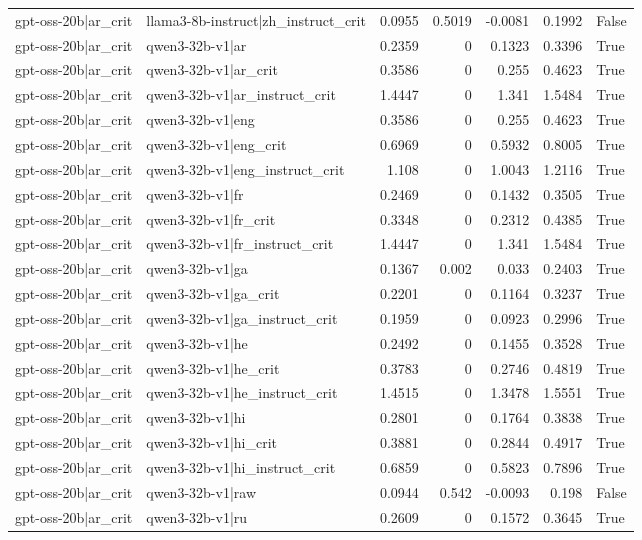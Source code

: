 \begin{table}
\begin{tabular}{l l r r r r l}
gpt-oss-20b|ar_crit & llama3-8b-instruct|zh_instruct_crit & 0.0955 & 0.5019 & -0.0081 & 0.1992 & False \\
gpt-oss-20b|ar_crit & qwen3-32b-v1|ar & 0.2359 & 0 & 0.1323 & 0.3396 & True \\
gpt-oss-20b|ar_crit & qwen3-32b-v1|ar_crit & 0.3586 & 0 & 0.255 & 0.4623 & True \\
gpt-oss-20b|ar_crit & qwen3-32b-v1|ar_instruct_crit & 1.4447 & 0 & 1.341 & 1.5484 & True \\
gpt-oss-20b|ar_crit & qwen3-32b-v1|eng & 0.3586 & 0 & 0.255 & 0.4623 & True \\
gpt-oss-20b|ar_crit & qwen3-32b-v1|eng_crit & 0.6969 & 0 & 0.5932 & 0.8005 & True \\
gpt-oss-20b|ar_crit & qwen3-32b-v1|eng_instruct_crit & 1.108 & 0 & 1.0043 & 1.2116 & True \\
gpt-oss-20b|ar_crit & qwen3-32b-v1|fr & 0.2469 & 0 & 0.1432 & 0.3505 & True \\
gpt-oss-20b|ar_crit & qwen3-32b-v1|fr_crit & 0.3348 & 0 & 0.2312 & 0.4385 & True \\
gpt-oss-20b|ar_crit & qwen3-32b-v1|fr_instruct_crit & 1.4447 & 0 & 1.341 & 1.5484 & True \\
gpt-oss-20b|ar_crit & qwen3-32b-v1|ga & 0.1367 & 0.002 & 0.033 & 0.2403 & True \\
gpt-oss-20b|ar_crit & qwen3-32b-v1|ga_crit & 0.2201 & 0 & 0.1164 & 0.3237 & True \\
gpt-oss-20b|ar_crit & qwen3-32b-v1|ga_instruct_crit & 0.1959 & 0 & 0.0923 & 0.2996 & True \\
gpt-oss-20b|ar_crit & qwen3-32b-v1|he & 0.2492 & 0 & 0.1455 & 0.3528 & True \\
gpt-oss-20b|ar_crit & qwen3-32b-v1|he_crit & 0.3783 & 0 & 0.2746 & 0.4819 & True \\
gpt-oss-20b|ar_crit & qwen3-32b-v1|he_instruct_crit & 1.4515 & 0 & 1.3478 & 1.5551 & True \\
gpt-oss-20b|ar_crit & qwen3-32b-v1|hi & 0.2801 & 0 & 0.1764 & 0.3838 & True \\
gpt-oss-20b|ar_crit & qwen3-32b-v1|hi_crit & 0.3881 & 0 & 0.2844 & 0.4917 & True \\
gpt-oss-20b|ar_crit & qwen3-32b-v1|hi_instruct_crit & 0.6859 & 0 & 0.5823 & 0.7896 & True \\
gpt-oss-20b|ar_crit & qwen3-32b-v1|raw & 0.0944 & 0.542 & -0.0093 & 0.198 & False \\
gpt-oss-20b|ar_crit & qwen3-32b-v1|ru & 0.2609 & 0 & 0.1572 & 0.3645 & True \\

\end{tabular}
\end{table}
